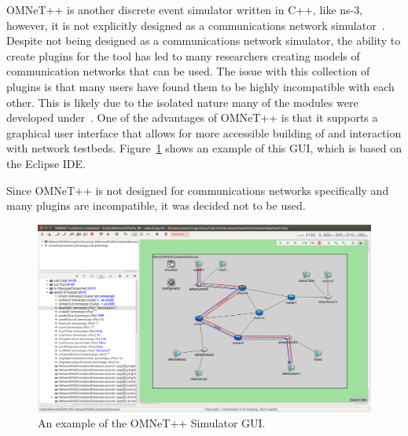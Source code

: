 OMNeT++ is another discrete event simulator written in C++, like ns-3, however, it is not explicitly designed as a communications network simulator~\cite{omnet++}.
Despite not being designed as a communications network simulator, the ability to create plugins for the tool has led to many researchers creating models of communication networks that can be used.
The issue with this collection of plugins is that many users have found them to be highly incompatible with each other.
This is likely due to the isolated nature many of the modules were developed under~\cite{tool_survey}.
One of the advantages of OMNeT++ is that it supports a graphical user interface that allows for more accessible building of and interaction with network testbeds.
Figure~\ref{omnet_gui} shows an example of this GUI, which is based on the Eclipse IDE.\par
Since OMNeT++ is not designed for communications networks specifically and many plugins are incompatible, it was decided not to be used.

\begin{figure}[!ht]
    \centering
    \includegraphics[width=\textwidth,keepaspectratio]{Images/Chpt2/omnet_gui.png}
    \caption{An example of the OMNeT++ Simulator GUI.}
    \label{omnet_gui}
\end{figure}

